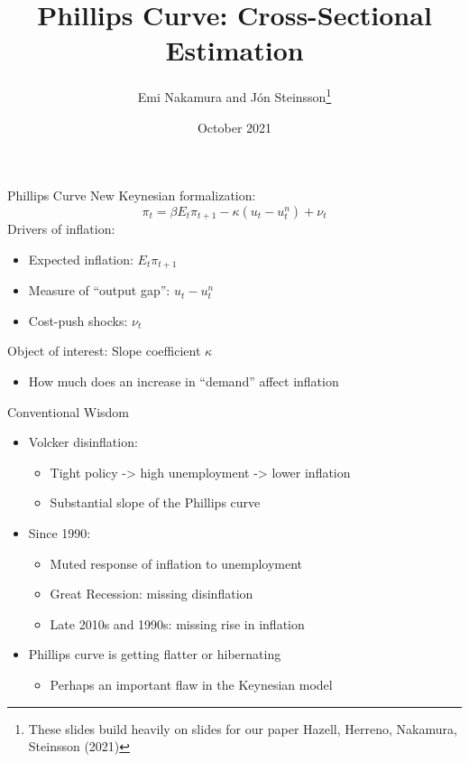 \documentclass[10pt]{beamer}
\title[Phillips Curve]{Phillips Curve: Cross-Sectional Estimation}
\author[Nakamura, Steinsson]{Emi Nakamura and J\'{o}n Steinsson\thanks{These slides build heavily on slides for our paper Hazell, Herreno, Nakamura, Steinsson (2021)}}
\institute[Berkeley]{UC Berkeley}
\date{October 2021}
\begin{document}
\begin{frame}
  \titlepage
\end{frame}


\begin{frame}{Phillips Curve}
	New Keynesian formalization:
	\[ \pi_{t} = \beta E_{t} \pi_{t+1} - \kappa (u_{t} - u_{t}^{n} ) + \nu_{t} \]
	Drivers of inflation:
	\begin{itemize}
		\item Expected inflation: $E_{t} \pi_{t+1}$
		\item Measure of ``output gap'': $u_{t} - u_{t}^{n}$
		\item Cost-push shocks: $\nu_t$
	\end{itemize}
	\vspace{10pt}
	\vspace{10pt}
	Object of interest: Slope coefficient $\kappa$
	\begin{itemize}
		\item How much does an increase in ``demand'' affect inflation 
	\end{itemize}
\end{frame}


\begin{frame}{Conventional Wisdom}
	\begin{itemize}
		\itemsep1em 
		\item Volcker disinflation:
		\begin{itemize}
			\item Tight policy -> high unemployment -> lower inflation
			\item Substantial slope of the Phillips curve
		\end{itemize} 
		\item Since 1990:
		\begin{itemize}
			\item Muted response of inflation to unemployment
			\item Great Recession: missing disinflation 
			\item Late 2010s and 1990s: missing rise in inflation
		\end{itemize}
		\item Phillips curve is getting flatter or hibernating
		\begin{itemize}
			\item Perhaps an important flaw in the Keynesian model
		\end{itemize}
	\end{itemize}
\end{frame}
\end{document}
